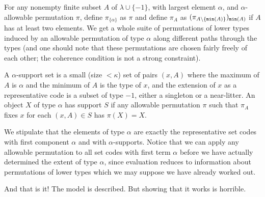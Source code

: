 \documentclass{slides}
\begin{document}
\begin{slide}

For any nonempty finite subset $A$ of $\lambda \cup \{-1\}$, with largest element $\alpha$, and $\alpha$-allowable permutation $\pi$, define $\pi_{\{\alpha\}}$ as $\pi$ and define $\pi_A$ as $(\pi_{A \setminus \{{\tt min}(A)\}})_{{\tt min}(A)}$ if $A$ has at least two elements.  We get a whole suite of permutations of lower types induced by an allowable permutation of type $\alpha$ along different paths through the types (and one should note that these permutations are chosen fairly freely of each other;  the coherence condition is not a strong constraint).

A $\alpha$-support set is a small (size $<\kappa$) set of pairs $(x,A)$ where the maximum of $A$ is $\alpha$ and the minimum of $A$ is the type of $x$, and the extension of $x$ as a representative code is a subset of type $-1$, either a singleton or a near-litter.  An object $X$ of type $\alpha$ has support $S$ if any allowable permutation $\pi$ such that
$\pi_A$ fixes $x$ for each $(x,A) \in S$ has $\pi(X)=X$.

We stipulate that the elements of type $\alpha$ are exactly the representative set codes with first component $\alpha$ and with $\alpha$-supports.  Notice that we can
apply any allowable permutation to all set codes with first term $\alpha$ before we have actually determined the extent of type $\alpha$, since evaluation reduces to information about permutations of lower types which we may suppose we have already worked out.

And that is it!  The model is described.  But showing that it works is horrible.

\end{slide}
\end{document}
